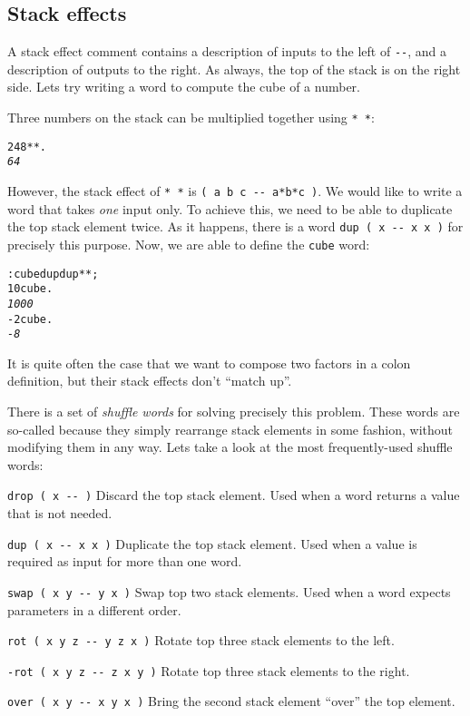 \documentclass[english]{article}
\begin{document}
\subsection{Stack effects}

A stack effect comment contains a description of inputs to the left
of \texttt{-{}-}, and a description of outputs to the right. As always,
the top of the stack is on the right side. Lets try writing a word
to compute the cube of a number.

Three numbers on the stack can be multiplied together using \texttt{{*}
{*}}:

\begin{alltt}
2 4 8 {*} {*} .
\emph{64}
\end{alltt}
However, the stack effect of \texttt{{*} {*}} is \texttt{( a b c -{}-
a{*}b{*}c )}. We would like to write a word that takes \emph{one} input
only. To achieve this, we need to be able to duplicate the top stack
element twice. As it happens, there is a word \texttt{dup ( x -{}-
x x )} for precisely this purpose. Now, we are able to define the
\texttt{cube} word:

\begin{alltt}
: cube dup dup {*} {*} ;
10 cube .
\emph{1000}
-2 cube .
\emph{-8}
\end{alltt}
It is quite often the case that we want to compose two factors in
a colon definition, but their stack effects don't {}``match up''.

There is a set of \emph{shuffle words} for solving precisely this
problem. These words are so-called because they simply rearrange stack
elements in some fashion, without modifying them in any way. Lets
take a look at the most frequently-used shuffle words:

\texttt{drop ( x -{}- )} Discard the top stack element. Used when
a word returns a value that is not needed.

\texttt{dup ( x -{}- x x )} Duplicate the top stack element. Used
when a value is required as input for more than one word.

\texttt{swap ( x y -{}- y x )} Swap top two stack elements. Used when
a word expects parameters in a different order.

\texttt{rot ( x y z -{}- y z x )} Rotate top three stack elements
to the left.

\texttt{-rot ( x y z -{}- z x y )} Rotate top three stack elements
to the right.

\texttt{over ( x y -{}- x y x )} Bring the second stack element {}``over''
the top element.
\end{document}
